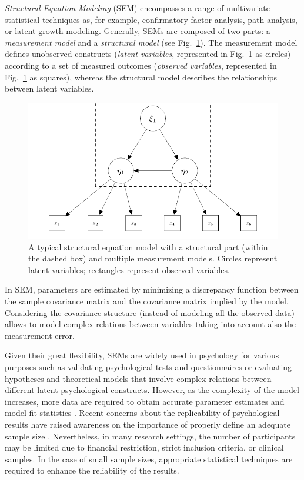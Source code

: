 \documentclass[graybox]{svmult}
\begin{document}
\emph{Structural Equation Modeling} (SEM) encompasses  a range of multivariate statistical techniques as, for example, confirmatory factor analysis, path analysis, or latent growth modeling. Generally, SEMs are composed of two parts: a \emph{measurement model} and a \emph{structural model} (see Fig.~\ref{fig:example_sem}).   The measurement model defines unobserved constructs (\emph{latent variables}, represented in Fig.~\ref{fig:example_sem} as circles) according to a set of measured outcomes (\emph{observed variables}, represented in Fig.~\ref{fig:example_sem} as squares), whereas the structural model describes the relationships between latent variables.
\begin{figure}[b]
	\sidecaption
	\label{fig:example_sem}
	\includegraphics[width = .50\textwidth]{figure/Plot_SEM}
	\caption{A typical structural equation model with a structural part (within the dashed box) and multiple measurement models. Circles represent latent variables; rectangles represent observed variables.}
\end{figure}

In SEM, parameters are estimated by minimizing a discrepancy function between the sample covariance matrix and the covariance matrix implied by the model. Considering the covariance structure (instead of modeling all the observed data) allows to model complex relations between variables taking into account also the  measurement error.

Given their great flexibility, SEMs are widely used in psychology for various purposes such as validating psychological tests and questionnaires or evaluating hypotheses and theoretical models that involve complex relations between different latent psychological constructs. However, as the complexity of the model increases, more data are required to obtain accurate parameter estimates and model fit statistics \cite{wolfSampleSizeRequirements2013}. 
Recent concerns about the replicability of psychological results have raised awareness on the importance of properly define an adequate sample size \cite{ioannidisWhyMostPublished2005, opensciencecollaborationEstimatingReproducibilityPsychological2015}.  
Nevertheless, in many research settings, the number of participants may be limited due to financial restriction, strict inclusion criteria, or clinical samples. In the case of small sample sizes, appropriate statistical techniques are required to enhance the reliability of the results.
\end{document}
